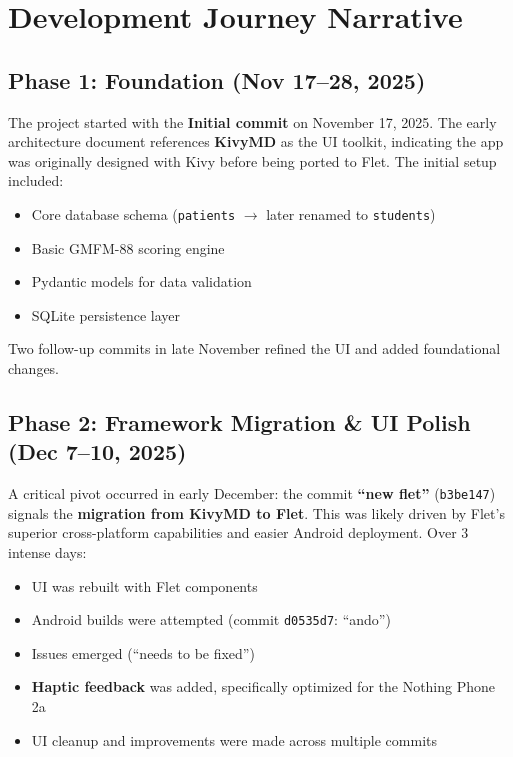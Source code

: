 \documentclass[12pt,a4paper]{article}
\begin{document}
\section{Development Journey Narrative}

\subsection{Phase 1: Foundation (Nov 17--28, 2025)}

The project started with the \textbf{Initial commit} on November 17, 2025. The early architecture document references \textbf{KivyMD} as the UI toolkit, indicating the app was originally designed with Kivy before being ported to Flet. The initial setup included:

\begin{itemize}[leftmargin=2em]
    \item Core database schema (\texttt{patients} $\rightarrow$ later renamed to \texttt{students})
    \item Basic GMFM-88 scoring engine
    \item Pydantic models for data validation
    \item SQLite persistence layer
\end{itemize}

Two follow-up commits in late November refined the UI and added foundational changes.

\subsection{Phase 2: Framework Migration \& UI Polish (Dec 7--10, 2025)}

A critical pivot occurred in early December: the commit \textbf{``new flet''} (\texttt{b3be147}) signals the \textbf{migration from KivyMD to Flet}. This was likely driven by Flet's superior cross-platform capabilities and easier Android deployment. Over 3 intense days:

\begin{itemize}[leftmargin=2em]
    \item UI was rebuilt with Flet components
    \item Android builds were attempted (commit \texttt{d0535d7}: ``ando'')
    \item Issues emerged (``needs to be fixed'')
    \item \textbf{Haptic feedback} was added, specifically optimized for the Nothing Phone 2a
    \item UI cleanup and improvements were made across multiple commits
\end{itemize}
\end{document}
